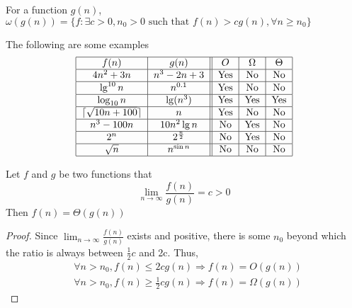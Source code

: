 				\begin{definition}
					For a function $g(n)$, $\omega(g(n)) = \{f: \exists c > 0, n_0 > 0 \text{ such that } f(n) > cg(n), \forall n\ge n_0\}$
				\end{definition}


				\begin{example}
					The following are some examples
					\begin{align}
						\centering
						\begin{tabular}{|c|c||c|c|c|}
							\hline
							$f(n)$ & $g(n)$ & $O$ & $\Omega$ & $\Theta$\\
							\hline
							$4n^2 + 3n$ & $n^3 - 2n + 3$ & Yes & No & No \\
							\hline
							$\lg^{10} n$ & $n^{0.1}$ & Yes & No & No \\
							\hline
							$\log_{10} n$ & $\lg(n^3)$ & Yes & Yes & Yes \\
							\hline
							$\lceil \sqrt{10n + 100} \rceil$ & $n$ & Yes & No & No \\
							\hline
							$n^3 -100n$ & $10n^2\lg n$ & No & Yes & No\\
							\hline
							$2^n$ & $2^{\frac n2}$ & No & Yes & No \\
							\hline
							$\sqrt{n}$ & $n^{\sin n}$ & No & No & No\\
							\hline
						\end{tabular}
					\end{align}
				\end{example}

				\begin{theorem}
					Let $f$ and $g$ be two functions that
					\begin{equation}
						\lim_{n\rightarrow \infty} \frac{f(n)}{g(n)} = c > 0
					\end{equation}
					Then $f(n) = \Theta(g(n))$
				\end{theorem}

				\begin{proof}
					Since $\lim_{n\rightarrow \infty} \frac{f(n)}{g(n)}$ exists and positive, there is some $n_0$ beyond which the ratio is always between $\frac12 c$ and 2c. Thus,
					\begin{align}
						& \forall n > n_0, f(n) \le 2cg(n) \Rightarrow f(n) = O(g(n)) \\
						& \forall n > n_0, f(n) \ge \frac12cg(n) \Rightarrow f(n) = \Omega(g(n))
					\end{align}
				\end{proof}

